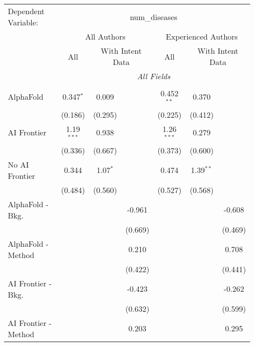 \begingroup
\centering
\begin{tabular}{lcccccc}
   \tabularnewline \midrule \midrule
   Dependent Variable: & \multicolumn{6}{c}{num\_diseases}\\
 & \multicolumn{3}{c}{All Authors} & \multicolumn{3}{c}{Experienced Authors} \\
\cmidrule(lr){2-4} \cmidrule(lr){5-7}
 & \multicolumn{1}{c}{All} & \multicolumn{2}{c}{With Intent Data} & \multicolumn{1}{c}{All} & \multicolumn{2}{c}{With Intent Data} \\
\cmidrule(lr){2-2} \cmidrule(lr){3-4} \cmidrule(lr){5-5} \cmidrule(lr){6-7}
 & \multicolumn{6}{c}{\textit{All Fields}} \\ \\
   AlphaFold               & 0.347$^{*}$  & 0.009      &             & 0.452$^{**}$ & 0.370       &   \\   
                           & (0.186)      & (0.295)    &             & (0.225)      & (0.412)     &   \\   
   AI Frontier             & 1.19$^{***}$ & 0.938      &             & 1.26$^{***}$ & 0.279       &   \\   
                           & (0.336)      & (0.667)    &             & (0.373)      & (0.600)     &   \\   
   No AI Frontier          & 0.344        & 1.07$^{*}$ &             & 0.474        & 1.39$^{**}$ &   \\   
                           & (0.484)      & (0.560)    &             & (0.527)      & (0.568)     &   \\   
   AlphaFold - Bkg.        &              &            & -0.961      &              &             & -0.608\\   
                           &              &            & (0.669)     &              &             & (0.469)\\   
   AlphaFold - Method      &              &            & 0.210       &              &             & 0.708\\   
                           &              &            & (0.422)     &              &             & (0.441)\\   
   AI Frontier - Bkg.      &              &            & -0.423      &              &             & -0.262\\   
                           &              &            & (0.632)     &              &             & (0.599)\\   
   AI Frontier - Method    &              &            & 0.203       &              &             & 0.295\\   

\end{tabular}
